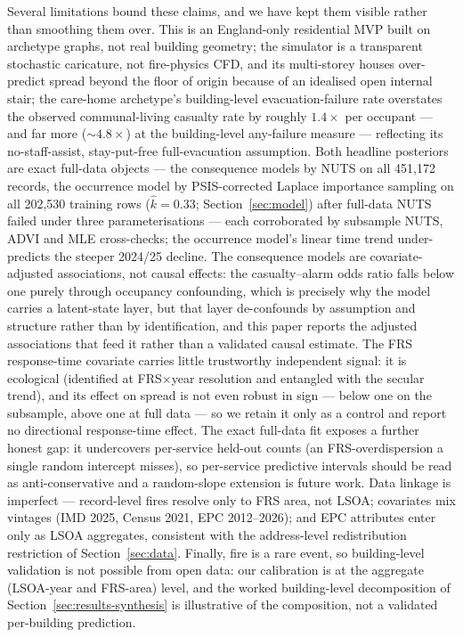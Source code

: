 Several limitations bound these claims, and we have kept them visible rather than
smoothing them over. This is an England-only residential MVP built on archetype
graphs, not real building geometry; the simulator is a transparent stochastic
caricature, not fire-physics CFD, and its multi-storey houses over-predict spread
beyond the floor of origin because of an idealised open internal stair; the
care-home archetype's building-level evacuation-failure rate overstates the
observed communal-living casualty rate by roughly $1.4\times$ per occupant ---
and far more ($\sim$$4.8\times$) at the building-level any-failure measure ---
reflecting its no-staff-assist, stay-put-free full-evacuation assumption. Both
headline posteriors are exact full-data objects --- the consequence models by
NUTS on all 451{,}172 records, the occurrence model by PSIS-corrected Laplace
importance sampling on all 202{,}530 training rows ($\hat{k}=0.33$;
Section~\ref{sec:model}) after full-data NUTS failed under three
parameterisations --- each corroborated by subsample NUTS, ADVI and MLE
cross-checks; the occurrence model's linear time trend under-predicts the
steeper 2024/25 decline. The consequence models are
covariate-adjusted associations, not causal effects: the casualty--alarm odds ratio
falls below one purely through occupancy confounding, which is precisely why the
model carries a latent-state layer, but that layer de-confounds by assumption and
structure rather than by identification, and this paper reports the adjusted
associations that feed it rather than a validated causal estimate. The FRS
response-time covariate carries little trustworthy independent signal: it is
ecological (identified at FRS$\times$year resolution and entangled with the secular
trend), and its effect on spread is not even robust in sign --- below one on the
subsample, above one at full data --- so we retain it only as a control and report no
directional response-time effect. The exact full-data fit exposes a further honest
gap: it undercovers per-service held-out counts (an FRS-overdispersion a single
random intercept misses), so per-service predictive intervals should be read as
anti-conservative and a random-slope extension is future work. Data linkage is imperfect --- record-level
fires resolve only to FRS area, not LSOA; covariates mix vintages (IMD 2025, Census
2021, EPC 2012--2026); and EPC attributes enter only as LSOA aggregates, consistent
with the address-level redistribution restriction of Section~\ref{sec:data}. Finally,
fire is a rare event, so building-level validation is not possible from open data: our
calibration is at the aggregate (LSOA-year and FRS-area) level, and the worked
building-level decomposition of Section~\ref{sec:results-synthesis} is illustrative of
the composition, not a validated per-building prediction.

